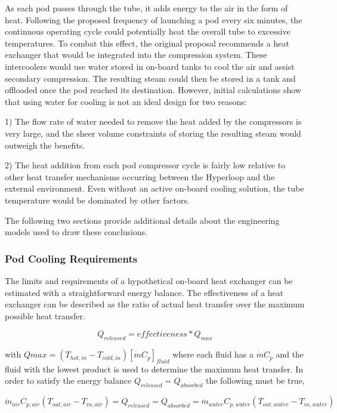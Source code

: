 \documentclass[heading.tex]{subfiles}
\begin{document}
As each pod passes through the tube, it adds energy to the air in the form of heat.
Following the proposed frequency of launching a pod every six minutes,
the continuous operating cycle could potentially heat the overall tube to excessive temperatures.
To combat this effect, the original proposal recommends a heat exchanger that would be integrated into the compression system.
These intercoolers would use water stored in on-board tanks to cool the air and assist secondary compression.
The resulting steam could then be stored in a tank and offloaded once the pod reached its destination.
However, initial calculations show that using water for cooling is not an ideal design for two reasons:

1) The flow rate of water needed to remove the heat added by the compressors is very large, and the sheer volume constraints of storing
the resulting steam would outweigh the benefits.

2) The heat addition from each pod compressor cycle is fairly low relative to other heat transfer mechanisms occurring between the Hyperloop
and the external environment. Even without an active on-board cooling solution, the tube temperature would be dominated by other factors.

The following two sections provide additional details about the engineering models used to draw these conclusions.

\subsubsection{Pod Cooling Requirements}

The limits and requirements of a hypothetical on-board heat exchanger can be estimated with a straightforward energy balance. The
effectiveness of a heat exchanger can be described as the ratio of actual heat transfer over the maximum possible heat transfer.

\begin{equation*}
{Q}_{released}  = effectiveness * {Q}_{max}
\end{equation*}


with $Qmax=\left(T_{hot,in} - T_{cold,in}\right) [ \dot{m} C_{p} ]_{fluid}$ where each fluid has a $\dot{m} C_{p}$ and the fluid with the lowest
product is used to determine the maximum heat transfer. In order to satisfy the energy balance $Q_{released}=Q_{absorbed}$ the following must be true,

\begin{equation*}
\dot{m}_{air} C_{p, air} (T_{out, air} - T_{in, air}) = {Q}_{released} = {Q}_{absorbed}= \dot{m}_{water} C_{p,water} (T_{out, water} - T_{in, water})
\end{equation*}
\end{document}
